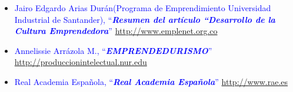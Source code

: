 \documentclass[11pt,letterpaper,titlepage]{article}
\begin{document}
\begin{itemize}

\item \textcolor{blue}{Jairo Edgardo Arias Dur\'an(Programa de Emprendimiento Universidad Industrial de Santander), ``\textbf{\textit{Resumen del art\'iculo ``Desarrollo de la Cultura Emprendedora}}'' \href{http://www.emplenet.org.co/roce/documentos/desarrollo\%20de\%20la\%20cultura\%20emprendedora.pdf}{http://www.emplenet.org.co}}

% 

\item \textcolor{blue}{Annelissie Arr\'azola M., ``\textbf{\textit{EMPRENDEDURISMO}}'' \href{http://produccionintelectual.nur.edu/archivos/emprendedurismo.pdf}{http://produccionintelectual.nur.edu}}

\item \textcolor{blue}{Real Academia Espa\~nola, ``\textbf{\textit{Real Academia Espa\~nola}}'' \href{http://www.rae.es}{http://www.rae.es}}



% 
\end{itemize}
\end{document}

